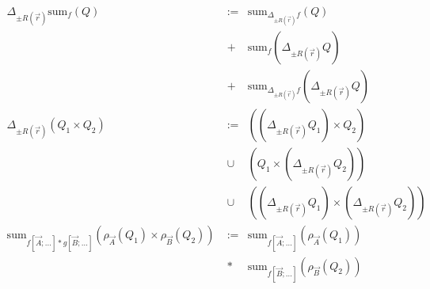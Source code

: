 \documentclass{article}
\def\algsum{\mathrm{sum}}
\begin{document}
\begin{eqnarray}
\Delta_{\pm R(\vec{r})} \algsum_f(Q) &:=&
\algsum_{\Delta_{\pm R(\vec{r})} f}(Q)
\\
\nonumber
&+& \algsum_f(\Delta_{\pm R(\vec{r})} Q)
\\
\nonumber
&+& \algsum_{\Delta_{\pm R(\vec{r})} f}(\Delta_{\pm R(\vec{r})} Q)
\\
\Delta_{\pm R(\vec{r})} (Q_1 \times Q_2) &:=&
((\Delta_{\pm R(\vec{r})} Q_1) \times Q_2)
\\
\nonumber &\cup&
(Q_1 \times (\Delta_{\pm R(\vec{r})} Q_2))
\\
\nonumber &\cup&
((\Delta_{\pm R(\vec{r})} Q_1) \times (\Delta_{\pm R(\vec{r})} Q_2))
\\
\algsum_{f[\vec{A};\dots] * g[\vec{B};\dots]}(\rho_{\vec{A}}(Q_1) \times \rho_{\vec{B}}(Q_2)) \;
&:=&
\algsum_{f[\vec{A};\dots]}(\rho_{\vec{A}}(Q_1)) \\
\nonumber &*& \algsum_{f[\vec{B};\dots]}(\rho_{\vec{B}}(Q_2))
\end{eqnarray}
\end{document}
